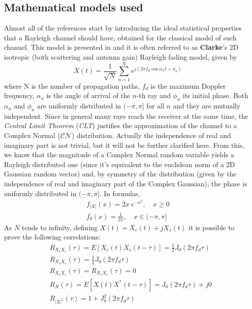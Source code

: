 \subsection{Mathematical models used} %
\label{subsec:math_models}

Almost all of the references start by introducing the ideal statistical properties that a Rayleigh channel should have, obtained for the classical model of such channel. This model is presented in \cite{clarke} and it is often referred to as \textbf{Clarke}'s 2D isotropic (both scattering and antenna gain) Rayleigh fading model, given by%
%
\begin{equation}
X(t) = \frac{1}{\sqrt{N}} \sum_{n=1}^{N} e^{j(2\pi f_d \cos \alpha_n t + \phi_n)}
\end{equation}%
%
where N is the number of propagation paths, $f_d$ is the maximum Doppler frequency, $\alpha_n$ is the angle of arrival of the $n$-th ray and $\phi_n$ its initial phase. Both $\alpha_n$ and $\phi_n$ are uniformly distributed in $(-\pi,\pi]$ for all $n$ and they are mutually independent. Since in general many rays reach the receiver at the same time, the \textit{Central Limit Theorem} (\textit{CLT}) justifies the approximation of the channel to a Complex Normal ($\mathcal{CN}$) distribution. Actually the independence of real and imaginary part is not trivial, but it will not be further clarified here. From this, we know that the magnitude of a Complex Normal random variable yields a Rayleigh distributed one (since it's equivalent to the euclidean norm of a 2D Gaussian random vector) and, by symmetry of the distribution (given by the independence of real and imaginary part of the Complex Gaussian), the phase is uniformly distributed in $(-\pi,\pi]$. In formulas,%
%
\begin{subequations}
\begin{align}
	f_{|X|}(x) = 2x \ e^{-x^2}, \quad x \geq 0\\
	f_{\theta}(x) = \frac{1}{2\pi}, \quad x \in (-\pi,\pi]
\end{align}
\end{subequations}%
%
As $N$ tends to infinity, defining $X(t) = X_c(t) + jX_s(t)$ it is possible to prove the following correlations:%
%
\begin{subequations}
	\label{eqs:correlations}
\begin{align}
&R_{X_cX_c}(\tau) = E[X_c(t)X_c(t-\tau)] = \frac{1}{2} J_0(2\pi f_d\tau)\\
&R_{X_sX_s}(\tau) = \frac{1}{2} J_0(2\pi f_d\tau)\\
&R_{X_cX_s}(\tau) = R_{X_sX_c}(\tau) = 0\\
&R_X(\tau) = E[X(t) X^*(t-\tau)] = J_0(2\pi f_d \tau) + j0\\
&R_{|X|^2}(\tau) = 1 + J_0^2(2\pi f_d \tau)
\end{align}
\end{subequations}%
